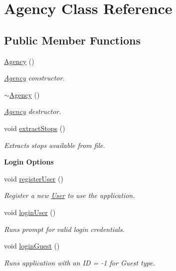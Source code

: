 \hypertarget{class_agency}{}\section{Agency Class Reference}
\label{class_agency}
\subsection*{Public Member Functions}
\begin{DoxyCompactItemize}
\item 
\hyperlink{group___agency_gaf6fc6c4dec00025fce567183f67edbaa}{Agency} ()
\begin{DoxyCompactList}\small\item\em \hyperlink{class_agency}{Agency} constructor. \end{DoxyCompactList}\item 
\hyperlink{group___agency_ga922750a7051987df9bb697769fdf0256}{$\sim$\+Agency} ()
\begin{DoxyCompactList}\small\item\em \hyperlink{class_agency}{Agency} destructor. \end{DoxyCompactList}\item 
void \hyperlink{group___agency_ga10184101969b3eeea8eea72cb058fbd4}{extract\+Stops} ()
\begin{DoxyCompactList}\small\item\em Extracts stops available from file. \end{DoxyCompactList}\end{DoxyCompactItemize}
\begin{Indent}\textbf{ Login Options}\par
\begin{DoxyCompactItemize}
\item 
void \hyperlink{group___agency_ga75a16a58bcbc705df50e89531f513c49}{register\+User} ()
\begin{DoxyCompactList}\small\item\em Register a new \hyperlink{class_user}{User} to use the application. \end{DoxyCompactList}\item 
void \hyperlink{group___agency_gae4523bdce3f7af3a2be444c4a2ae0630}{login\+User} ()
\begin{DoxyCompactList}\small\item\em Runs prompt for valid login credentials. \end{DoxyCompactList}\item 
void \hyperlink{group___agency_gaddfd587d88999314b59aab8be6438271}{login\+Guest} ()
\begin{DoxyCompactList}\small\item\em Runs application with an ID = -\/1 for Guest type. \end{DoxyCompactList}\end{DoxyCompactItemize}
\end{Indent}

